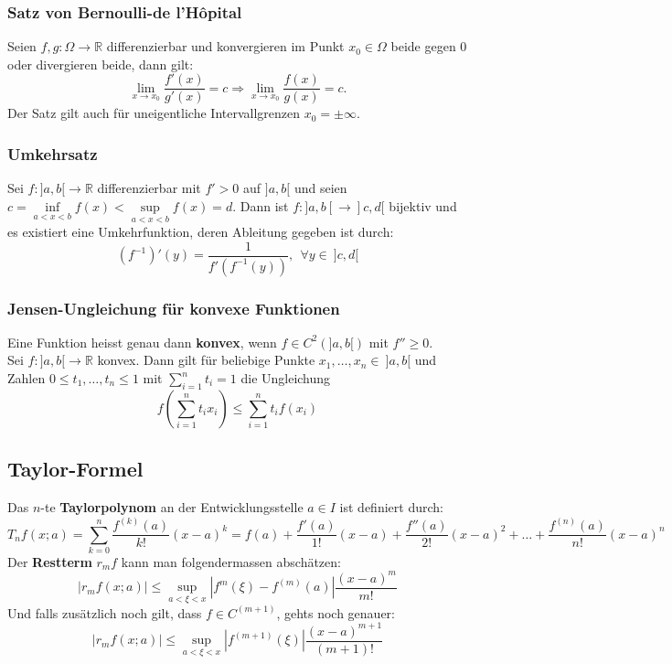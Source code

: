 \documentclass[a4paper,10pt]{scrartcl}
\begin{document}
\subsubsection{Satz von Bernoulli-de l'Hôpital}
Seien $f,g: \Omega\to\mathbb{R}$ differenzierbar und konvergieren im Punkt $x_0\in\Omega$ beide gegen 0 oder divergieren beide, dann gilt: 
\begin{equation}
	\lim\limits_{x\to x_0}\frac{f'(x)}{g'(x)} = c \Rightarrow
	\lim\limits_{x\to x_0} \frac{f(x)}{g(x)}=c.
\end{equation}
Der Satz gilt auch für uneigentliche Intervallgrenzen $x_0=\pm\infty$. 

\subsubsection{Umkehrsatz}
Sei $f:]a,b[\to \mathbb{R}$ differenzierbar mit $f'>0$ auf $]a,b[$ und seien $c = \inf\limits_{a<x<b} f(x)< \sup\limits_{a<x<b} f(x)= d$. Dann ist $f:]a,b[\to ]c,d[$ bijektiv und es existiert eine Umkehrfunktion, deren Ableitung gegeben ist durch: 
\begin{equation}
	(f^{-1})'(y)=\frac{1}{f'(f^{-1}(y))},\ \ \forall y \in\ ]c,d[ 
\end{equation}
\subsubsection{Jensen-Ungleichung für konvexe Funktionen}
Eine Funktion heisst genau dann \textbf{konvex}, wenn $f\in C^2(]a,b[)$ mit $f''\geq 0$. \\
Sei $f:]a,b[\to \mathbb{R}$ konvex. Dann gilt für beliebige Punkte $x_1, \dots, x_n \in \ ]a,b[$ und Zahlen $0\leq t_1, \dots, t_n\leq 1$ mit $\sum_{i=1}^{n}t_i=1$ die Ungleichung
\begin{equation}
	f\left( \sum_{i=1}^{n} t_ix_i \right) \leq \sum_{i=1}^{n} t_if(x_i)
\end{equation}
\subsection{Taylor-Formel}
Das $n$-te \textbf{Taylorpolynom} an der Entwicklungsstelle $a\in I$  ist definiert durch:
\begin{equation}
	T_{n}f(x;a)=\sum _{k=0}^{n}{\frac{f^{(k)}(a)}{k!}}(x-a)^{k}=f(a)+{\frac {f'(a)}{1!}}(x-a)+{\frac {f''(a)}{2!}}(x-a)^{2}+\ldots +{\frac {f^{(n)}(a)}{n!}}(x-a)^{n}
\end{equation}
Der \textbf{Restterm} $r_mf$ kann man folgendermassen abschätzen: 
\begin{equation}
	|r_mf(x;a)|\leq \sup_{a<\xi<x} \left| f^{m}(\xi)-f^{(m)}(a) \right|\frac{(x-a)^{m}}{m!}
\end{equation}
Und falls zusätzlich noch gilt, dass $f\in C^{(m+1)}$, gehts noch genauer: 
\begin{equation}
	|r_mf(x;a)|\leq \sup_{a<\xi<x} \left| f^{(m+1)}(\xi) \right|\frac{(x-a)^{m+1}}{(m+1)!}
\end{equation}
\end{document}
